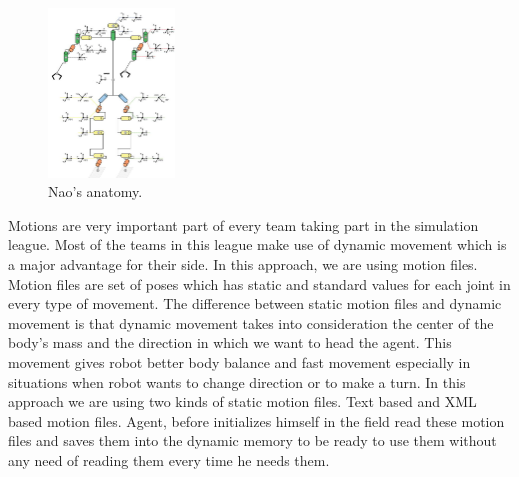 \begin{figure}[t!]
\centering
  \includegraphics[width=0.3\textwidth]{Chapter3/figures/Models_NaoAnatomy.png}
  \caption{Nao's anatomy.}
  \label{fig:NaoAnatomy}
\end{figure}




Motions are very important part of every team taking part in the simulation league. Most of the teams in this league make use of dynamic movement which is a major advantage for their side. In this approach, we are using motion files. Motion files are set of poses which has static and standard values for each joint in every type of movement. The difference between static motion files and dynamic movement is that dynamic movement takes into consideration the center of the body's mass and the direction in which we want to head the agent. This movement gives robot better body balance and fast movement especially in situations when robot wants to change direction or to make a turn. In this approach we are using two kinds of static motion files. Text based and XML based motion files. Agent, before initializes himself in the field read these motion files and saves them into the dynamic memory to be ready to use them without any need of reading them every time he needs them.


